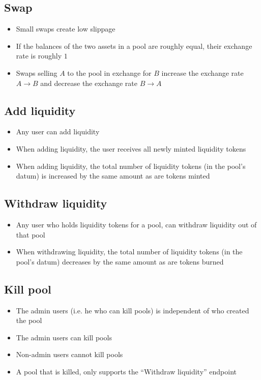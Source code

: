 \documentclass{article}
\begin{document}
\subsection*{Swap}

\begin{itemize}
  \item Small swaps create low slippage
  \item If the balances of the two assets in a pool are roughly equal, their
    exchange rate is roughly $1$
  \item Swaps selling $A$ to the pool in exchange for $B$ increase the exchange
    rate $A \rightarrow B$ and decrease the exchange rate $B \rightarrow A$
\end{itemize}

\subsection*{Add liquidity}

\begin{itemize}
  \item Any user can add liquidity
  \item When adding liquidity, the user receives all newly minted liquidity
    tokens
  \item When adding liquidity, the total number of liquidity tokens (in the
    pool's datum) is increased by the same amount as are tokens minted
\end{itemize}

\subsection*{Withdraw liquidity}

\begin{itemize}
  \item Any user who holds liquidity tokens for a pool, can withdraw liquidity
    out of that pool
  \item When withdrawing liquidity, the total number of liquidity tokens (in the
    pool's datum) decreases by the same amount as are tokens burned
\end{itemize}

\subsection*{Kill pool}

\begin{itemize}
  \item The admin users (i.e. he who can kill pools) is independent of who
    created the pool
  \item The admin users can kill pools
  \item Non-admin users cannot kill pools
  \item A pool that is killed, only supports the ``Withdraw liquidity'' endpoint
\end{itemize}
\end{document}
